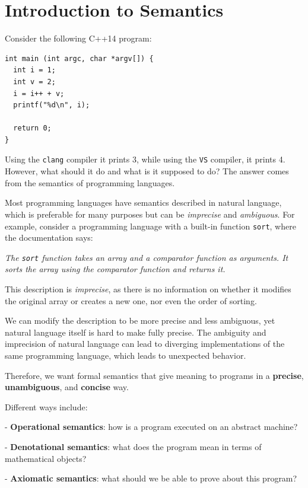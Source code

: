 \section{Introduction to Semantics}
Consider the following C++14 program:
\begin{lstlisting}[language=iPython]
int main (int argc, char *argv[]) {
  int i = 1;
  int v = 2;
  i = i++ + v;
  printf("%d\n", i);

  return 0;
}
\end{lstlisting}

Using the \texttt{clang} compiler it prints 3, while using the \texttt{VS} compiler, it prints 4. However, what should it do and what is it supposed to do? The answer comes from the semantics of programming languages. 

Most programming languages have semantics described in natural language, which is preferable for many purposes but can be \textit{imprecise} and \textit{ambiguous}. For example, consider a programming language with a built-in function \texttt{sort}, where the documentation says:

\textit{The \texttt{sort} function takes an array and a comparator function as arguments. It sorts the array using the comparator function and returns it.}

This description is \textit{imprecise}, as there is no information on whether it modifies the original array or creates a new one, nor even the order of sorting. 

We can modify the description to be more precise and less ambiguous, yet natural language itself is hard to make fully precise. The ambiguity and imprecision of natural language can lead to diverging implementations of the same programming language, which leads to unexpected behavior.  

Therefore, we want formal semantics that give meaning to programs in a \textbf{precise}, \textbf{unambiguous}, and \textbf{concise} way. 

Different ways include:

- \textbf{Operational semantics}: how is a program executed on an abstract machine?

- \textbf{Denotational semantics}: what does the program mean in terms of mathematical objects?

- \textbf{Axiomatic semantics}: what should we be able to prove about this program?